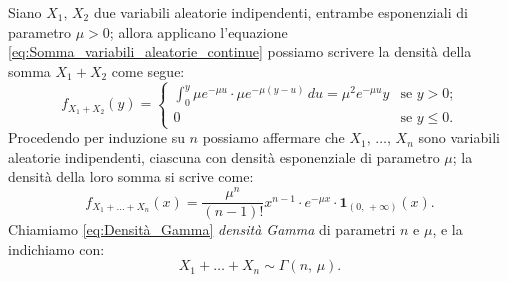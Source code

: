         \begin{defn}\label{defn:Densità_Gamma}
            Siano $X_1,\, X_2$ due variabili aleatorie indipendenti, entrambe esponenziali di parametro $\mu > 0$; allora applicano l'equazione \eqref{eq:Somma_variabili_aleatorie_continue} possiamo scrivere la densità della somma $X_1+X_2$ come segue: \[
                f_{X_1+X_2}(y) = \begin{cases}
                    \int_{0}^{y} \mu e^{-\mu u} \cdot \mu e^{-\mu(y-u)}\, du = \mu^2 e^{-\mu u} y & \text{se $y > 0$;} \\
                    0 & \text{se $y \leq 0$.}
                \end{cases}
            \] Procedendo per induzione su $n$ possiamo affermare che $X_1,\, \ldots,\, X_{n}$ sono variabili aleatorie indipendenti, ciascuna con densità esponenziale di parametro $\mu$; la densità della loro somma si scrive come:
            \begin{equation}\label{eq:Densità_Gamma}
                f_{X_1+\ldots+X_n}(x) = \frac{\mu^n}{(n-1)!}x^{n-1} \cdot 
                e^{-\mu x} \cdot \mathbf{1}_{(0,\,+\infty)}(x)
            .\end{equation}
            Chiamiamo \eqref{eq:Densità_Gamma} \emph{densità Gamma} di parametri $n$ e $\mu$, e la indichiamo con: \[
                X_1 + \ldots + X_{n} \sim \Gamma(n,\, \mu)
            .\]
        \end{defn}
